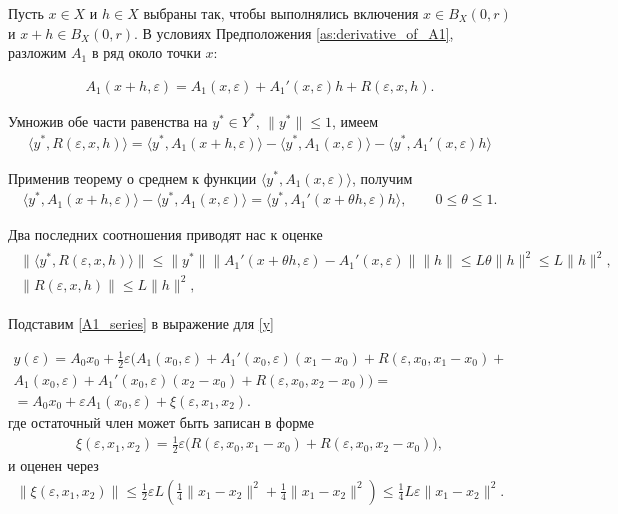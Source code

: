 \documentclass[../main.tex]{subfiles}
\begin{document}
Пусть $x \in X$ и $h \in X$ выбраны так, чтобы выполнялись включения $x\in B_X(0, r)$ и $x+h \in B_X(0, r)$.
В условиях Предположения \ref{as:derivative_of_A1}, разложим $A_1$ в ряд около точки $x$:

\begin{gather}\label{A1_series}
 A_1(x + h,\varepsilon) = A_1(x,\varepsilon) + A_1'(x,\varepsilon) h + R(\varepsilon, x, h).
\end{gather}

Умножив обе части равенства на $y^* \in Y^*$, $\|y^*\| \leqslant 1$, имеем
\begin{gather*}
 \langle y^*, R(\varepsilon, x, h) \rangle = 
 \langle y^*, A_1(x + h,\varepsilon) \rangle -
 \langle y^*, A_1(x,\varepsilon) \rangle -
 \langle y^*, A_1'(x,\varepsilon) h \rangle
\end{gather*}

Применив теорему о среднем к функции $\langle y^*, A_1(x,\varepsilon) \rangle$, получим
\begin{gather*}
 \langle y^*, A_1(x + h,\varepsilon) \rangle -
 \langle y^*, A_1(x,\varepsilon) \rangle = 
 \langle y^*, A_1'(x + \theta h,\varepsilon) h \rangle,
 \qquad
 0 \leqslant \theta \leqslant 1.
\end{gather*}

Два последних соотношения приводят нас к оценке
\begin{gather}
 \begin{gathered}
 \|\langle y^*, R(\varepsilon, x, h) \rangle \| \leqslant
 \| y^* \| 
 \| A_1'(x + \theta h,\varepsilon) -
 A_1'(x,\varepsilon) \| 
 \| h \| \leqslant 
 L \theta \|h\|^2 \leqslant
 L \|h\|^2, \\
 \| R(\varepsilon, x, h) \| \leqslant
 L \|h\|^2, 
 \end{gathered}
\end{gather}

Подставим \eqref{A1_series} в выражение для \eqref{y}

\begin{gather*}
 y(\varepsilon) =
 A_0x_0 +
 \frac{1}{2}\varepsilon \Big(
 A_1(x_0,\varepsilon) +
 A_1'(x_0,\varepsilon)(x_1 - x_0)+ 
 R(\varepsilon, x_0, x_1 - x_0) + \\ 
 A_1(x_0,\varepsilon) +
 A_1'(x_0,\varepsilon)(x_2 - x_0)+ 
 R(\varepsilon, x_0, x_2 - x_0)
 \Big) = \\ = 
 A_0x_0 + 
 \varepsilon A_1(x_0,\varepsilon) +
 \xi(\varepsilon,x_1,x_2).
\end{gather*}
где остаточный член может быть записан в форме
\begin{gather*}
 \xi(\varepsilon,x_1,x_2) = \frac{1}{2}\varepsilon\big(R(\varepsilon, x_0, x_1 - x_0) + R(\varepsilon, x_0, x_2 - x_0)\big),
\end{gather*}
и оценен через
\begin{gather*}
 \|\xi(\varepsilon,x_1,x_2)\| \leqslant \frac{1}{2}\varepsilon L \left(\frac{1}{4}\|x_1 - x_2\|^2 + \frac{1}{4}\|x_1 - x_2\|^2 \right) \leqslant \frac{1}{4}L\varepsilon\|x_1 - x_2\|^2. 
\end{gather*}
\end{document}

